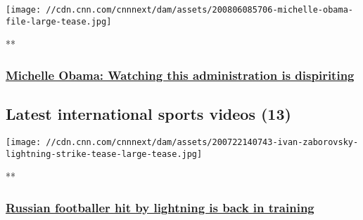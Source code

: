 \href{/videos/health/2020/08/06/michelle-obama-low-grade-depression-trump-nr-vpx.cnn/video/playlists/this-week-in-politics/}{}

\texttt{[image: //cdn.cnn.com/cnnnext/dam/assets/200806085706-michelle-obama-file-large-tease.jpg]}

**

\hypertarget{michelle-obama-watching-this-administration-is-dispiriting}{%
\subsubsection{\texorpdfstring{\href{/videos/health/2020/08/06/michelle-obama-low-grade-depression-trump-nr-vpx.cnn/video/playlists/this-week-in-politics/}{Michelle
Obama: Watching this administration is
dispiriting}}{Michelle Obama: Watching this administration is dispiriting}}\label{michelle-obama-watching-this-administration-is-dispiriting}}

\hypertarget{latest-international-sports-videos-13}{%
\subsection{Latest international sports videos
(13)}\label{latest-international-sports-videos-13}}

\href{/videos/sports/2020/07/22/ivan-zaborovsky-lightning-strike-recovery-znamya-truda-russia-football-spt-intl-lon-orig.cnn/video/playlists/international-sport-playlist-general-videos/}{}

\texttt{[image: //cdn.cnn.com/cnnnext/dam/assets/200722140743-ivan-zaborovsky-lightning-strike-tease-large-tease.jpg]}

**

\hypertarget{russian-footballer-hit-by-lightning-is-back-in-training}{%
\subsubsection{\texorpdfstring{\href{/videos/sports/2020/07/22/ivan-zaborovsky-lightning-strike-recovery-znamya-truda-russia-football-spt-intl-lon-orig.cnn/video/playlists/international-sport-playlist-general-videos/}{Russian
footballer hit by lightning is back in
training}}{Russian footballer hit by lightning is back in training}}\label{russian-footballer-hit-by-lightning-is-back-in-training}}

\href{/videos/sports/2020/07/29/cesc-fabregas-time-out-football-racism-coronavirus-arsenal-chelsea-spt-intl-orig-lon.cnn/video/playlists/international-sport-playlist-general-videos/}{}

